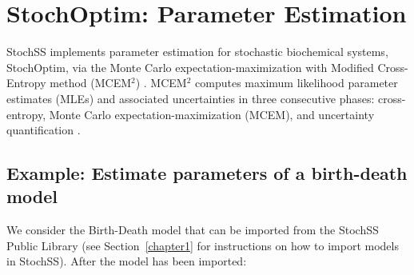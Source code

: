 \chapter{StochOptim: Parameter Estimation}
\label{chapter-stochoptim}

StochSS implements parameter estimation for stochastic biochemical systems, StochOptim, via the Monte Carlo expectation-maximization with Modified Cross-Entropy method (MCEM$^2$) \cite{bernie}.
MCEM$^2$ computes maximum likelihood parameter estimates (MLEs) and associated uncertainties in three consecutive phases: cross-entropy, Monte Carlo expectation-maximization (MCEM), and uncertainty quantification \cite{bernie}.

\section{Example: Estimate parameters of a birth-death model}
We consider the Birth-Death model that can be imported from the StochSS Public Library (see Section~\ref{chapter1} for instructions on how to import models in StochSS).
After the model has been imported:
